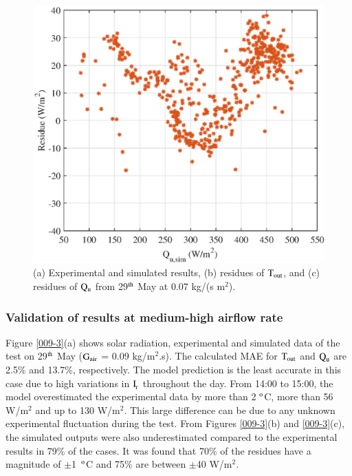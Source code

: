 \begin{figure}[ht!]
\begin{minipage}{0.39\columnwidth}
		\includegraphics[scale=0.5,width=1.0\columnwidth]{figs/007-residue-6.eps}
	\end{minipage}
	
	\caption{(a) Experimental and simulated results, (b) residues of $\rm{T_{out}}$, and (c) residues of $\rm{Q_{u}}$ from 29$^{\rm{th}}$ May at 0.07 kg/(s m$^2$).}
	\label{007-3}
\end{figure}


\newpage
\subsubsection{Validation of results at medium-high airflow rate}

Figure \ref{009-3}(a) shows solar radiation, experimental and simulated data of the test on 29$^{\rm{th}}$ May ($\rm{G_{air}}$ = 0.09 kg/m$^2$.s). The calculated MAE for $\rm{T_{out}}$ and $\rm{Q_{u}}$ are 2.5\% and 13.7\%, respectively. The model prediction is the least accurate in this case due to high variations in $\rm{I_{\!_T}}$ throughout the day. From 14:00 to 15:00, the model overestimated the experimental data by more than 2 $^{\rm{o}}$C, more than 56 W/m$^2$ and up to 130 W/m$^2$. This large difference can be due to any unknown experimental fluctuation during the test. From Figures \ref{009-3}(b) and \ref{009-3}(c), the simulated outputs were also underestimated compared to the experimental results in 79\% of the cases. It was found that 70\% of the residues have a magnitude of \mbox{$\pm$1 $^{\rm{o}}$C} and 75\% are between $\pm$40 W/m$^2$.

